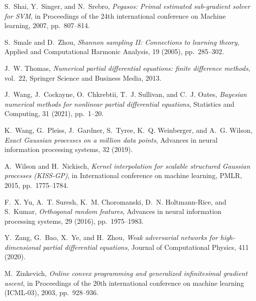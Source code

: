 \documentclass[10pt,reqno]{amsart}
\newcommand{\1}{{\chi}}
\numberwithin{equation}{section}
\theoremstyle{thmlemcorr}
\numberwithin{theorem}{section}
\theoremstyle{thmlemcorr*}
\theoremstyle{defi}
\theoremstyle{remexample}
\theoremstyle{ass}
\begin{document}
\begin{thebibliography}{10}
	{\sc S.~Shai, Y.~Singer, and N.~Srebro}, {\em Pegasos: Primal estimated
		sub-gradient solver for {SVM}}, in Proceedings of the 24th international
	conference on Machine learning, 2007, pp.~807--814.
	
	{\sc S.~Smale and D.~Zhou}, {\em Shannon sampling {II}: Connections to learning
		theory}, Applied and Computational Harmonic Analysis, 19 (2005),
	pp.~285--302.
	
	{\sc J.~W. Thomas}, {\em Numerical partial differential equations: finite
		difference methods}, vol.~22, Springer Science and Business Media, 2013.
	
	{\sc J.~Wang, J.~Cockayne, O.~Chkrebtii, T.~J. Sullivan, and C.~J. Oates}, {\em
		Bayesian numerical methods for nonlinear partial differential equations},
	Statistics and Computing, 31 (2021), pp.~1--20.
	
	{\sc K.~Wang, G.~Pleiss, J.~Gardner, S.~Tyree, K.~Q. Weinberger, and A.~G.
		Wilson}, {\em Exact {G}aussian processes on a million data points}, Advances
	in neural information processing systems, 32 (2019).
	
	{\sc A.~Wilson and H.~Nickisch}, {\em Kernel interpolation for scalable
		structured {G}aussian processes ({KISS}-{GP})}, in International conference
	on machine learning, PMLR, 2015, pp.~1775--1784.
	
	{\sc F.~X. Yu, A.~T. Suresh, K.~M. Choromanski, D.~N. Holtmann-Rice, and
		S.~Kumar}, {\em Orthogonal random features}, Advances in neural information
	processing systems, 29 (2016), pp.~1975--1983.
	
	{\sc Y.~Zang, G.~Bao, X.~Ye, and H.~Zhou}, {\em Weak adversarial networks for
		high-dimensional partial differential equations}, Journal of Computational
	Physics, 411 (2020).
	
	{\sc M.~Zinkevich}, {\em Online convex programming and generalized
		infinitesimal gradient ascent}, in Proceedings of the 20th international
	conference on machine learning ({ICML}-03), 2003, pp.~928--936.
	
\end{thebibliography}
\end{document}
